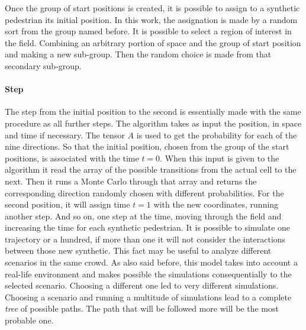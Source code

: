 \documentclass[class=article, crop=false]{standalone}
\begin{document}
Once the group of start positions is created, it is possible to assign to a synthetic pedestrian its initial position.
In this work, the assignation is made by a random sort from the group named before.
It is possible to select a region of interest in the field.
Combining an arbitrary portion of space and the group of start position and making a new sub-group.
Then the random choice is made from that secondary sub-group.

\paragraph{Step}
The step from the initial position to the second is essentially made with the same procedure as all further steps.
The algorithm takes as input the position, in space and time if necessary.
The tensor $A$ is used to get the probability for each of the nine directions.
So that the initial position, chosen from the group of the start positions, is associated with the time $t=0$.
When this input is given to the algorithm it read the array of the possible transitions from the actual cell to the next.
Then it runs a Monte Carlo through that array and returns the corresponding direction randomly chosen with different probabilities.
For the second position, it will assign time $t=1$ with the new coordinates, running another step.
And so on, one step at the time, moving through the field and increasing the time for each synthetic pedestrian.
It is possible to simulate one trajectory or a hundred, if more than one it will not consider the interactions between those new synthetic.
This fact may be useful to analyze different scenarios in the same crowd.
As also said before, this model takes into account a real-life environment and makes possible the simulations consequentially to the selected scenario.
Choosing a different one led to very different simulations.
Choosing a scenario and running a multitude of simulations lead to a complete \emph{tree} of possible paths.
The path that will be followed more will be the most probable one.

\newpage
\end{document}
